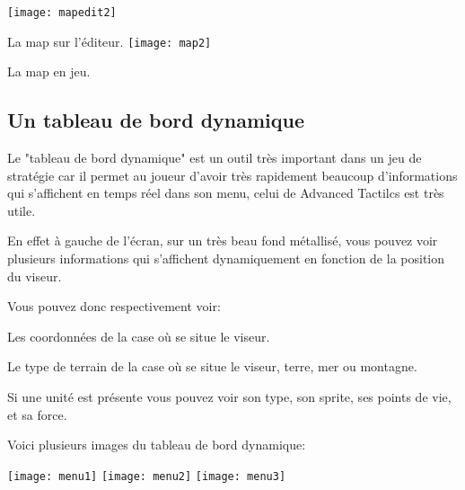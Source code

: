 \documentclass{article}
\begin{document}
\newpage

\begin{center}
\texttt{[image: mapedit2]}
\newline
\par
La map sur l'éditeur.
\newline
\texttt{[image: map2]}
\newline
\par
La map en jeu.
\end{center}

\newpage

\subsection{Un tableau de bord dynamique}

\par
Le "tableau de bord dynamique" est un outil très important dans un jeu de stratégie car il permet au joueur d'avoir très rapidement beaucoup d'informations qui s'affichent en temps réel dans son menu, celui de Advanced Tactilcs est très utile.
\newline

\par
En effet à gauche de l'écran, sur un très beau fond métallisé, vous pouvez voir plusieurs informations qui s'affichent dynamiquement en fonction de la position du viseur.
\newline

\par
Vous pouvez donc respectivement voir:
\newline

\par
Les coordonnées de la case où se situe le viseur.
\newline

\par
Le type de terrain de la case où se situe le viseur, terre, mer ou montagne.
\newline

\par
Si une unité est présente vous pouvez voir son type, son sprite, ses points de vie, et sa force.
\newline

\newpage

\par
Voici plusieurs images du tableau de bord dynamique:
\newline

\begin{center}
\texttt{[image: menu1]}
\newline
\texttt{[image: menu2]}
\newline
\texttt{[image: menu3]}
\newline
\end{center}
\end{document}
